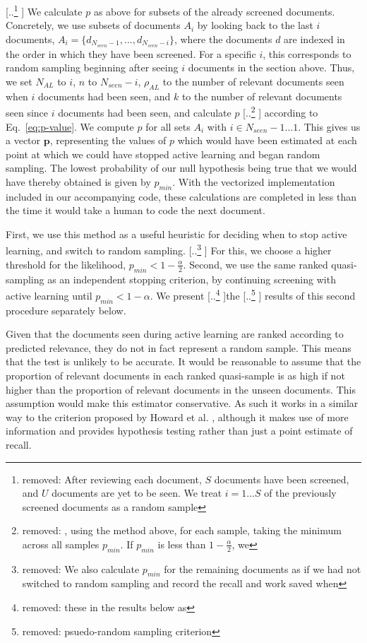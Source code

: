 \documentclass{bmcart}
\providecommand{\DIFadd}[1]{{\protect\color{blue} \sf #1}} %
\providecommand{\DIFdel}[1]{{\protect\color{red} [..\footnote{removed: #1} ]}} %
\providecommand{\DIFaddbegin}{} %
\providecommand{\DIFaddend}{} %
\providecommand{\DIFdelbegin}{} %
\providecommand{\DIFdelend}{} %
\newcommand{\DIFscaledelfig}{0.5}
\newlength{\DIFdelgraphicswidth} %
\newlength{\DIFdelgraphicsheight} %
\newcommand{\DIFaddincludegraphics}[2][]{{\color{blue}\fbox{\DIFOincludegraphics[#1]{#2}}}} %
\newcommand{\DIFdelincludegraphics}[2][]{%
\sbox{\DIFdelgraphicsbox}{\DIFOincludegraphics[#1]{#2}}%
\settoboxwidth{\DIFdelgraphicswidth}{\DIFdelgraphicsbox} %
\settoboxtotalheight{\DIFdelgraphicsheight}{\DIFdelgraphicsbox} %
\scalebox{\DIFscaledelfig}{%
\parbox[b]{\DIFdelgraphicswidth}{\usebox{\DIFdelgraphicsbox}\\[-\baselineskip] \rule{\DIFdelgraphicswidth}{0em}}\llap{\resizebox{\DIFdelgraphicswidth}{\DIFdelgraphicsheight}{%
\setlength{\unitlength}{\DIFdelgraphicswidth}%
\begin{picture}(1,1)%
\thicklines\linethickness{2pt} %
{\color[rgb]{1,0,0}\put(0,0){\framebox(1,1){}}}%
{\color[rgb]{1,0,0}\put(0,0){\line( 1,1){1}}}%
{\color[rgb]{1,0,0}\put(0,1){\line(1,-1){1}}}%
\end{picture}%
}\hspace*{3pt}}} %
} %
\DeclareRobustCommand{\DIFaddbegin}{\DIFOaddbegin \let\includegraphics\DIFaddincludegraphics} %
\DeclareRobustCommand{\DIFaddend}{\DIFOaddend \let\includegraphics\DIFOincludegraphics} %
\DeclareRobustCommand{\DIFdelbegin}{\DIFOdelbegin \let\includegraphics\DIFdelincludegraphics} %
\DeclareRobustCommand{\DIFdelend}{\DIFOaddend \let\includegraphics\DIFOincludegraphics} %
\begin{document}
	\DIFdelbegin \DIFdel{After reviewing each document, $S$ documents have been screened,
	and $U$ documents are yet to be seen. We treat $i = 1 \dots S$ of the previously screened documents as a random sample}\DIFdelend \DIFaddbegin \DIFadd{We calculate $p$ as above for subsets of the already screened documents. Concretely, we use subsets of documents $A_i$ by looking back to the last $i$ documents, $A_i = \{d_{N_{seen} - 1}, ..., d_{N_{seen} - i}\}$, where the documents $d$ are indexed in the order in which they have been screened. For a specific $i$, this corresponds to  random sampling beginning after seeing $i$ documents in the section above.
	Thus, we set 
	$N_{AL}$ to $i$, 
	$n$ to $N_{seen}-i$, 
	$\rho_{AL}$ to the number of relevant documents seen when $i$ documents had been seen,
	and $k$ to the number of relevant documents seen since $i$ documents had been seen}\DIFaddend , and calculate $p$ \DIFdelbegin \DIFdel{, using the method above, for each sample, taking the minimum across all samples $p_{min}$. If $p_{min}$ is less than $1-\frac{\alpha}{2}$, we }\DIFdelend \DIFaddbegin \DIFadd{according to Eq.~\ref{eq:p-value}.
	We compute $p$ for all sets $A_i$ with $i \in {N_{seen}-1 \dots 1}$.
	This gives us a vector $\bm{p}$, representing the values of $p$ which would have been estimated at each point at which we could have stopped active learning and began random sampling. The lowest probability of our null hypothesis being true that we would have thereby obtained is given by $p_{min}$. With the vectorized implementation included in our accompanying code, these calculations are completed in less than the time it would take a human to code the next document.
	}

	\DIFadd{First, we use this method as a useful heuristic for deciding when to stop active learning, and }\DIFaddend switch to random sampling. \DIFdelbegin \DIFdel{We also calculate $p_{min}$ for the remaining documents as if we had not switched to random sampling and record the recall and work saved when }\DIFdelend \DIFaddbegin \DIFadd{For this, we choose a higher threshold for the likelihood, $p_{min} < 1-\frac{\alpha}{2}$. Second, we use the same ranked quasi-sampling as an independent stopping criterion, by continuing screening with active learning until }\DIFaddend $p_{min} < 1 - \alpha$. We present \DIFdelbegin \DIFdel{these in the results below as }\DIFdelend the \DIFdelbegin \DIFdel{psuedo-random sampling criterion }\DIFdelend \DIFaddbegin \DIFadd{results of this second procedure separately below.
	}

	\DIFadd{Given that the documents seen during active learning are ranked according to predicted relevance, they do not in fact represent a random sample. This means that the test is unlikely to be accurate. It would be reasonable to assume that the proportion of relevant documents in each ranked quasi-sample is as high if not higher than the proportion of relevant documents in the unseen documents. This assumption would make this estimator conservative. As such it works in a similar way to the criterion proposed by Howard et al. \cite{Howard2020}, although it makes use of more information and provides hypothesis testing rather than just a point estimate of recall}\DIFaddend .
\end{document}
